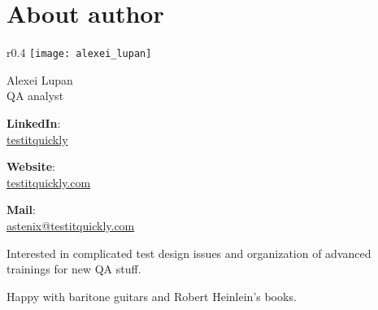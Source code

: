 \section*{About author}
\label{sec:About author}

\begingroup

\setlength{\intextsep}{-0.4em}
\setlength{\columnsep}{3em}

\begin{wrapfigure}[0]{r}{0.4\linewidth}
  \centering\texttt{[image: alexei\_lupan]}
\end{wrapfigure}

{\Large Alexei Lupan}\\
QA analyst

\textbf{LinkedIn}:\\
\href{https://www.linkedin.com/in/testitquickly/}{testitquickly}

\textbf{Website}:\\
\href{https://testitquickly.com/}{testitquickly.com}
 
\textbf{Mail}:\\
\href{mailto:astenix@testitquickly.com}{astenix@testitquickly.com} 


Interested in complicated test design issues and organization of advanced trainings for new QA stuff.

Happy with baritone guitars and Robert Heinlein's books.                                                                                                                                                                                                    

\endgroup

